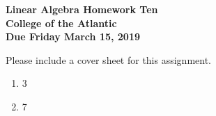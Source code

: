 \documentclass[11pt]{article}
\begin{document}
\pagestyle{empty}
 
\begin{center}
{\Large {\bf Linear Algebra Homework Ten}}\\
\medskip
{\large {\bf College of the Atlantic}}\\
\medskip
{\large {\bf Due Friday March 15, 2019}}\\
\medskip
\end{center}



\noindent Please include a cover sheet for this assignment.\\

\begin{enumerate}
\setlength{\itemsep}{-1mm}
\item 3
\item 7
\end{enumerate}
\end{document}
